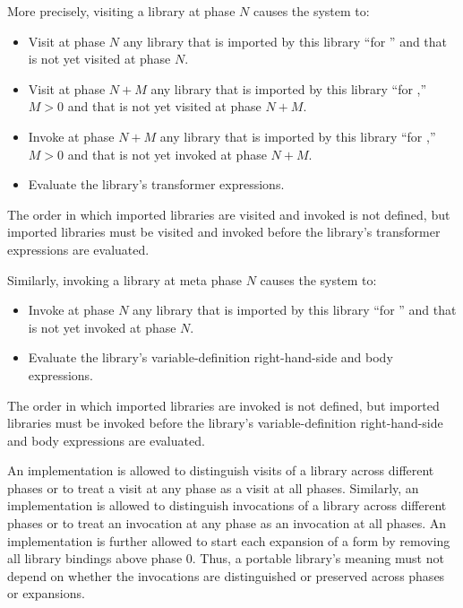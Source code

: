 \documentclass{monograph}
\begin{document}
More precisely, visiting a library at phase $N$ causes the system to:

\begin{itemize}
\item Visit at phase $N$ any library that is imported by this library
      ``for '' and that is not yet visited at phase $N$.
\item Visit at phase $N+M$ any library that is imported by this
      library ``for ,'' $M>0$ and that is not yet
      visited at phase $N+M$.
\item Invoke at phase $N+M$ any library that is imported by this
      library ``for ,'' $M>0$ and that is not yet
      invoked at phase $N+M$.
\item Evaluate the library's transformer expressions.
\end{itemize}

The order in which imported libraries are visited and invoked is not
defined, but imported libraries must be visited and invoked before the
library's transformer expressions are evaluated.

Similarly, invoking a library at meta phase $N$ causes the system to:

\begin{itemize}
\item Invoke at phase $N$ any library that is imported by this library
      ``for '' and that is not yet invoked at phase $N$.
\item Evaluate the library's variable-definition right-hand-side and body
      expressions.
\end{itemize}

The order in which imported libraries are invoked is not defined, but
imported libraries must be invoked before the library's variable-definition
right-hand-side and body expressions are evaluated.

An implementation is allowed to distinguish visits of a library across
different phases or to treat a visit at any phase as a visit at all
phases.
Similarly, an implementation is allowed to distinguish invocations of a
library across different phases or to treat an invocation at any phase as
an invocation at all phases.
An implementation is further allowed to start each expansion of a
 form by removing all library bindings above phase 0.
Thus, a portable library's meaning must not depend on whether the
invocations are distinguished or preserved across phases or 
expansions.
\end{document}
